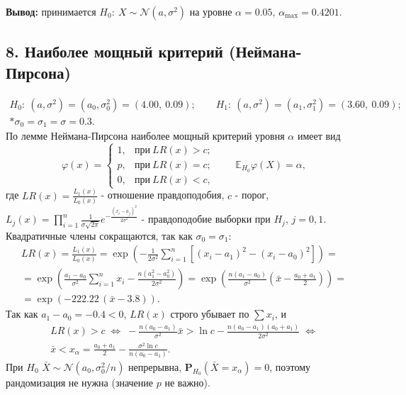 \documentclass[12pt]{spbstu-task}
\newcommand{\E}{\mathbb{E}}
\renewcommand{\Prob}{\mathbf{P}}
\begin{document}
\noindent\textbf{Вывод:} принимается \(H_0:\ X \sim \mathcal{N}(a, \sigma^2)\) на уровне \(\alpha = 0.05\), \(\alpha_{\max} = 0.4201\).

\subsection*{8. Наиболее мощный критерий (Неймана-Пирсона)}
\begin{gather*}
  H_0:\ (a, \sigma^2) = (a_0, \sigma_0^2) = (4.00,\ 0.09);\qquad
  H_1:\ (a, \sigma^2) = (a_1, \sigma_1^2) = (3.60,\ 0.09);\\*
  \sigma_0 = \sigma_1 = \sigma = 0.3.
\end{gather*}
По лемме Неймана-Пирсона наиболее мощный критерий уровня \(\alpha\) имеет вид
\begin{displaymath}
  \varphi(x) =
  \begin{cases}
    1, & \text{при}\ LR(x) > c;\\
    p, & \text{при}\ LR(x) = c;\\
    0, & \text{при}\ LR(x) < c,
  \end{cases}
  \qquad \E_{H_0}\varphi(X) = \alpha,
\end{displaymath}
где \(LR(x) = \frac{L_1(x)}{L_0(x)}\) - отношение правдоподобия, \(c\) - порог,
\(L_j(x) = \prod_{i=1}^{n}\frac{1}{\sigma\sqrt{2\pi}}e^{-\frac{(x_i - a_j)^2}{2\sigma^2}}\) - правдоподобие выборки
при \(H_j\), \(j = 0, 1\). Квадратичные члены сокращаются, так как \(\sigma_0 = \sigma_1\):
\begin{gather*}
  LR(x) = \frac{L_1(x)}{L_0(x)} = \exp\left(-\frac{1}{2\sigma^2}\sum_{i=1}^{n}\left[(x_i - a_1)^2 - (x_i - a_0)^2\right]\right) =\\
  = \exp\left(\frac{a_1 - a_0}{\sigma^2}\sum_{i=1}^{n}x_i - \frac{n\left(a_1^2 - a_0^2\right)}{2\sigma^2}\right)
  = \exp\left(\frac{n(a_1 - a_0)}{\sigma^2}\left(\bar{x} - \frac{a_0 + a_1}{2}\right)\right) =\\
  = \exp\left(-222.22\,(\bar{x} - 3.8)\right).
\end{gather*}
Так как \(a_1 - a_0 = -0.4 < 0\), \(LR(x)\) строго убывает по \(\sum x_i\), и
\begin{gather*}
  LR(x) > c
  \;\Longleftrightarrow\;
  -\frac{n(a_0 - a_1)}{\sigma^2}\bar{x} > \ln c - \frac{n(a_0 - a_1)(a_0 + a_1)}{2\sigma^2}
  \;\Longleftrightarrow\\
  \bar{x} < x_\alpha = \frac{a_0 + a_1}{2} - \frac{\sigma^2\ln c}{n(a_0 - a_1)}.
\end{gather*}
При \(H_0\) \(\bar{X} \sim \mathcal{N}\left(a_0, \sigma_0^2/n\right)\) непрерывна, \(\Prob_{H_0}(\bar{X} = x_\alpha) = 0\),
поэтому рандомизация не нужна (значение \(p\) не важно).
\end{document}
